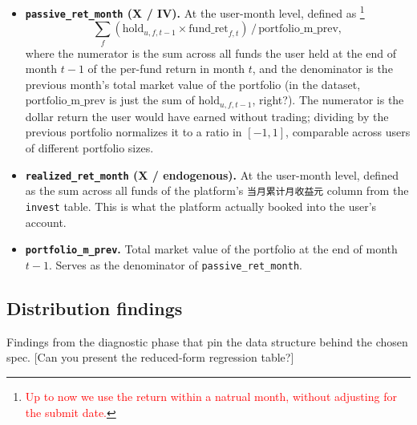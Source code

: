 \documentclass[11pt,letterpaper,english,final]{article}
\begin{document}
\begin{itemize}
\item \textbf{\texttt{passive\_ret\_month} (X / IV).} At the user-month level, defined as \footnote{\textcolor{red}{Up to now we use the return within a natrual month, without adjusting for the submit date.}}
$$\sum_{f}(\text{hold}_{u,f,t-1} \times \text{fund\_ret}_{f,t}) \,/\, \text{portfolio\_m\_prev},$$
 where the numerator is the sum across all funds the user held at the end of month $t-1$ of the per-fund return in month $t$, and the denominator is the previous month's total market value of the portfolio {\color{cyan}(in the dataset, $\text{portfolio\_m\_prev}$ is just the sum of $\text{hold}_{u,f,t-1}$, right?)}. The numerator is the dollar return the user would have earned without trading; dividing by the previous portfolio normalizes it to a ratio in $[-1, 1]$, comparable across users of different portfolio sizes.

\item \textbf{\texttt{realized\_ret\_month} (X / endogenous).} At the user-month level, defined as the sum across all funds of the platform's \texttt{当月累计月收益元} column from the \texttt{invest} table. This is what the platform actually booked into the user's account.

\item \textbf{\texttt{portfolio\_m\_prev}.} Total market value of the portfolio at the end of month $t-1$. Serves as the denominator of \texttt{passive\_ret\_month}.



\end{itemize}

\subsection{Distribution findings}
Findings from the diagnostic phase that pin the data structure behind the chosen spec. {\color{cyan}[Can you present the reduced-form regression table?]}
\end{document}
